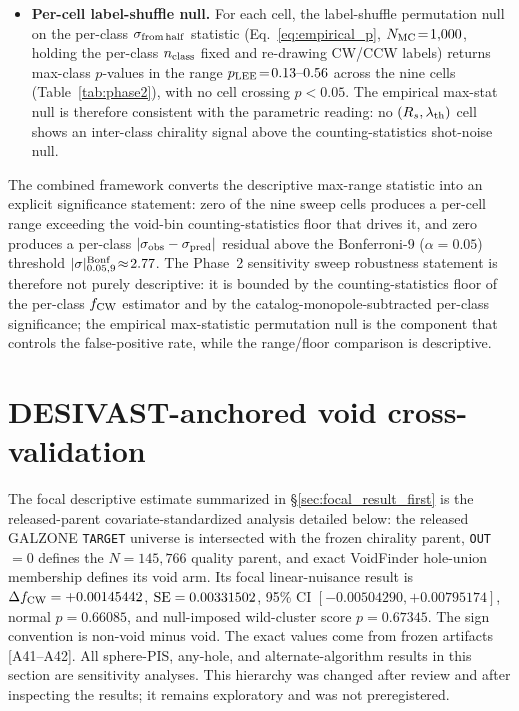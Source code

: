 \documentclass[twocolumn,linenumbers]{aastex702}
\begin{document}
\begin{itemize}
\item \textbf{Per-cell label-shuffle null.} For each cell, the
label-shuffle permutation null on the per-class $\sigma_{\rm from\,half}$
statistic (Eq.~\eqref{eq:empirical_p}, $N_{\rm MC}\!=\!1{,}000$,
holding the per-class $n_{\rm class}$ fixed and re-drawing CW/CCW
labels) returns max-class $p$-values in the range $p_{\rm LEE}\!=\!
0.13\text{--}0.56$ across the nine cells (Table~\ref{tab:phase2}),
with no cell crossing
$p\!<\!0.05$. The empirical max-stat null is therefore consistent
with the parametric reading: no $(R_s, \lambda_{\rm th})$ cell shows
an inter-class chirality signal above the counting-statistics
shot-noise null.
\end{itemize}

The combined framework converts the descriptive max-range statistic
into an explicit significance statement: zero of the nine sweep
cells produces a per-cell range exceeding the void-bin
counting-statistics floor that drives it, and zero produces a per-class
$|\sigma_{\rm obs}-\sigma_{\rm pred}|$ residual above the Bonferroni-9
($\alpha
= 0.05$) threshold $|\sigma|^{\rm Bonf}_{0.05,9}\!\approx\!2.77$. The
Phase~2 sensitivity sweep robustness statement is therefore not
purely descriptive: it is bounded by the counting-statistics floor
of the per-class $f_{\rm CW}$ estimator and by the
catalog-monopole-subtracted per-class significance; the empirical
max-statistic permutation null is the component that controls the
false-positive rate, while the range/floor comparison is descriptive.

\section{DESIVAST-anchored void cross-validation}\label{sec:desivast_primary}

The focal descriptive estimate summarized in
\S\ref{sec:focal_result_first} is the released-parent
covariate-standardized analysis detailed below: the released GALZONE
\texttt{TARGET} universe is intersected with the frozen chirality parent,
\texttt{OUT}$=0$ defines the $N=145{,}766$ quality parent, and exact
VoidFinder hole-union membership defines its void arm. Its focal
linear-nuisance result is $\Delta f_{\rm CW}=+0.00145442$,
${\rm SE}=0.00331502$, 95\% CI
$[-0.00504290,+0.00795174]$, normal $p=0.66085$, and null-imposed
wild-cluster score $p=0.67345$. The sign convention is non-void minus
void. The exact values come from frozen artifacts [A41--A42].
All sphere-PIS, any-hole, and alternate-algorithm results in this
section are sensitivity analyses. This hierarchy was changed after
review and after inspecting the results; it remains exploratory and
was not preregistered.
\end{document}
